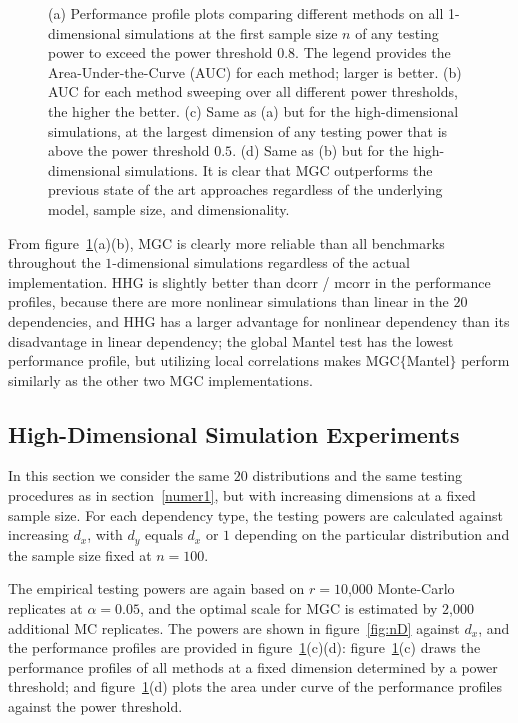 \documentclass[11pt]{article}
\begin{document}
\begin{figure}[htbp]
{(a) Performance profile plots comparing different methods on all 1-dimensional simulations at the first sample size $n$ of any testing power to exceed the power threshold 0.8. The legend provides the Area-Under-the-Curve (AUC) for each method; larger is better.
(b) AUC for each method sweeping over all different power thresholds, the higher the better.
(c) Same as (a) but for the high-dimensional simulations, at the largest dimension of any testing power that is above the power threshold $0.5$.
(d) Same as (b) but for the high-dimensional simulations.
It is clear that MGC outperforms the previous state of the art approaches regardless of the underlying model, sample size, and dimensionality.}
\label{fig:pp}
\end{figure}

From figure~\ref{fig:pp}(a)(b), MGC is clearly more reliable than all benchmarks throughout the $1$-dimensional simulations regardless of the actual implementation. HHG is slightly better than dcorr / mcorr in the performance profiles, because there are more nonlinear simulations than linear in the $20$ dependencies, and HHG has a larger advantage for nonlinear dependency than its disadvantage in linear dependency; the global Mantel test has the lowest performance profile, but utilizing local correlations makes MGC$\{$Mantel$\}$ perform similarly as the other two MGC implementations.

\subsection{High-Dimensional Simulation Experiments}
\label{numer2}
In this section we consider the same $20$ distributions and the same testing procedures as in section~\ref{numer1}, but with increasing dimensions at a fixed sample size. For each dependency type, the testing powers are calculated against increasing $d_{x}$, with $d_{y}$ equals $d_{x}$ or $1$ depending on the particular distribution and the sample size fixed at $n=100$.

The empirical testing powers are again based on $r=10$,$000$ Monte-Carlo replicates at $\alpha=0.05$, and the optimal scale for MGC is estimated by $2$,$000$ additional MC replicates. The powers are shown in figure~\ref{fig:nD} against $d_{x}$, and the performance profiles are provided in figure~\ref{fig:pp}(c)(d): figure~\ref{fig:pp}(c) draws the performance profiles of all methods at a fixed dimension determined by a power threshold; and figure~\ref{fig:pp}(d) plots the area under curve of the performance profiles against the power threshold.
\end{document}
